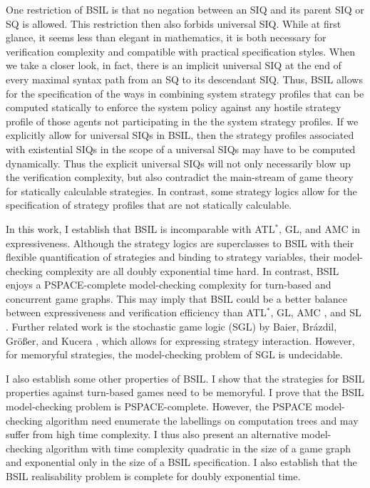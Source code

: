 One restriction of BSIL is that no negation between an SIQ and its parent SIQ or SQ is allowed. 
This restriction then also forbids universal SIQ.  
While at first glance, it seems less than elegant in mathematics, 
it is both necessary for verification complexity and 
compatible with practical specification styles.  
When we take a closer look, in fact, there is an implicit universal SIQ 
at the end of every maximal syntax path from an SQ to its descendant SIQ.  
Thus, BSIL allows for the specification of the ways in combining system strategy profiles that 
can be computed statically to enforce the system policy against 
any hostile strategy profile of those agents not participating in the the system strategy 
profiles.  
If we explicitly allow for universal SIQs in BSIL, 
then the strategy profiles associated with existential SIQs in the scope of a universal SIQs 
may have to be computed dynamically.  
Thus the explicit universal SIQs will not only necessarily blow up the verification complexity, 
but also contradict the main-stream of game theory for statically calculable strategies.  
In contrast, some strategy logics \cite{MMV10} 
allow for the specification of strategy profiles that are not statically calculable.  

In this work, I establish that BSIL is incomparable with ATL$^*$, GL, and AMC in expressiveness.  
Although the strategy logics \cite{CHP10,CLM10,MMV10} are superclasses to BSIL with their flexible quantification of strategies and binding to strategy variables, their model-checking complexity are all doubly exponential time hard.  
In contrast, BSIL enjoys a PSPACE-complete model-checking complexity for turn-based and concurrent game graphs.  
This may imply that BSIL could be a better balance between expressiveness and verification efficiency than ATL$^*$, GL, AMC \cite{AHK02}, and SL \cite{CHP10,MMV10}.
Further related work is the stochastic game logic (SGL) by Baier, Br\'azdil, Gr\"o{\ss}er, and Kucera \cite{BBGK07}, which allows for expressing strategy interaction.
However, for memoryful strategies, the model-checking problem of SGL is undecidable. 

I also establish some other properties of BSIL. 
I show that the strategies for BSIL properties against turn-based games need to be memoryful.
I prove that the BSIL model-checking problem is PSPACE-complete.  
However, the PSPACE model-checking algorithm need enumerate the labellings on computation trees and may suffer from high time complexity.
I thus also present an alternative model-checking algorithm with time complexity quadratic in the size of a game graph and exponential only in the size of a BSIL specification. 
I also establish that the BSIL realisability problem is complete for doubly exponential time.

